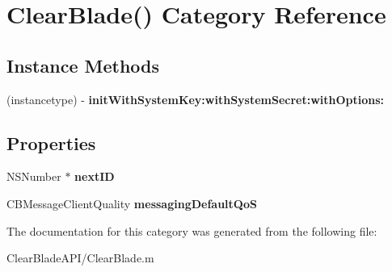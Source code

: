 \hypertarget{category_clear_blade_07_08}{\section{Clear\+Blade() Category Reference}
\label{category_clear_blade_07_08}
}
\subsection*{Instance Methods}
\begin{DoxyCompactItemize}
\item 
\hypertarget{category_clear_blade_07_08_a0d43815879fb0a4b769552ac24e08826}{(instancetype) -\/ {\bfseries init\+With\+System\+Key\+:with\+System\+Secret\+:with\+Options\+:}}\label{category_clear_blade_07_08_a0d43815879fb0a4b769552ac24e08826}

\end{DoxyCompactItemize}
\subsection*{Properties}
\begin{DoxyCompactItemize}
\item 
\hypertarget{category_clear_blade_07_08_aaf2f0eda9ee883fbd5e6e152579c9dc9}{N\+S\+Number $\ast$ {\bfseries next\+I\+D}}\label{category_clear_blade_07_08_aaf2f0eda9ee883fbd5e6e152579c9dc9}

\item 
\hypertarget{category_clear_blade_07_08_a88ac8ac01e37d365cbac7227e738bf40}{C\+B\+Message\+Client\+Quality {\bfseries messaging\+Default\+Qo\+S}}\label{category_clear_blade_07_08_a88ac8ac01e37d365cbac7227e738bf40}

\end{DoxyCompactItemize}


The documentation for this category was generated from the following file\+:\begin{DoxyCompactItemize}
\item 
Clear\+Blade\+A\+P\+I/Clear\+Blade.\+m\end{DoxyCompactItemize}
